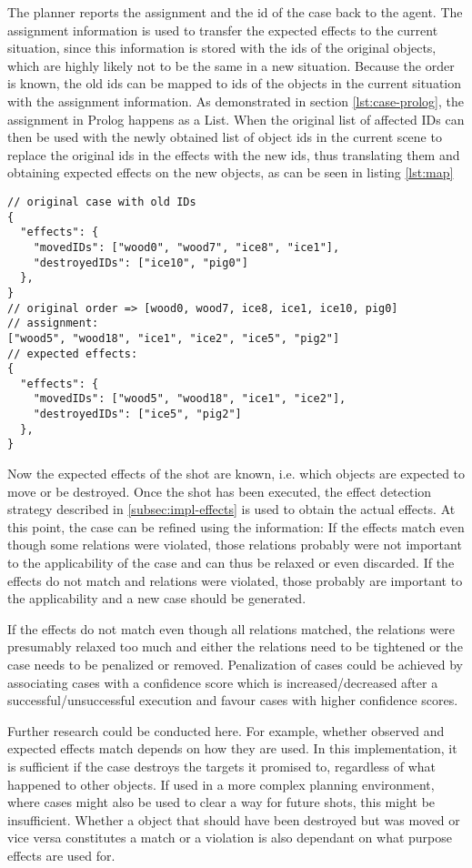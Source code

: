The planner reports the assignment and the id of the case back to the agent. The assignment information is used to transfer the expected effects to the current situation, since this information is stored with the ids of the original objects, which are highly likely not to be the same in a new  situation.
Because the order is known, the old ids can be mapped to ids of the objects in the current situation with the assignment information. As demonstrated in section \ref{lst:case-prolog}, the assignment in Prolog happens as a List.
When the original list of affected IDs can then be used with the newly obtained list of object ids in the current scene to replace the original ids in the effects with the new ids, thus translating them and obtaining expected effects on the new objects, as can be seen in listing \ref{lst:map}

\begin{lstlisting}[label=lst:map, caption=case information outside of Prolog]
// original case with old IDs
{
  "effects": {
    "movedIDs": ["wood0", "wood7", "ice8", "ice1"],
    "destroyedIDs": ["ice10", "pig0"]
  },
}
// original order => [wood0, wood7, ice8, ice1, ice10, pig0]
// assignment:
["wood5", "wood18", "ice1", "ice2", "ice5", "pig2"]
// expected effects:
{
  "effects": {
    "movedIDs": ["wood5", "wood18", "ice1", "ice2"],
    "destroyedIDs": ["ice5", "pig2"]
  },
}
\end{lstlisting}


Now the expected effects of the shot are known, i.e. which objects are expected to move or be destroyed.
Once the shot has been executed, the effect detection strategy described in \ref{subsec:impl-effects} is used to obtain the actual effects.
At this point, the case can be refined using the information: If the effects match even though some relations were violated, those relations probably were not important to the applicability of the case and can thus be relaxed or even discarded.
If the effects do not match and relations were violated, those probably are important to the applicability and a new case should be generated.

If the effects do not match even though all relations matched, the relations were presumably relaxed too much and either the relations need to be tightened or the case needs to be penalized or removed. Penalization of cases could be achieved by associating cases with a confidence score which is increased/decreased after a successful/unsuccessful execution and favour cases with higher confidence scores.


Further research could be conducted here. For example, whether observed and expected effects match depends on how they are used. In this implementation, it is sufficient if the case destroys the targets it promised to, regardless of what happened to other objects.
If used in a more complex planning environment, where cases might also be used to clear a way for future shots, this might be insufficient. Whether a object that should have been destroyed but was moved or vice versa constitutes a match or a violation is also dependant on what purpose effects are used for.